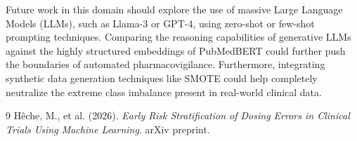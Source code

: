 \documentclass[11pt,a4paper]{article}
\begin{document}
Future work in this domain should explore the use of massive Large Language Models (LLMs), such as Llama-3 or GPT-4, using zero-shot or few-shot prompting techniques. Comparing the reasoning capabilities of generative LLMs against the highly structured embeddings of PubMedBERT could further push the boundaries of automated pharmacovigilance. Furthermore, integrating synthetic data generation techniques like SMOTE could help completely neutralize the extreme class imbalance present in real-world clinical data.

\begin{thebibliography}{9}
Hêche, M., et al. (2026).
\textit{Early Risk Stratification of Dosing Errors in Clinical Trials Using Machine Learning}.
arXiv preprint.
\end{thebibliography}
\end{document}
